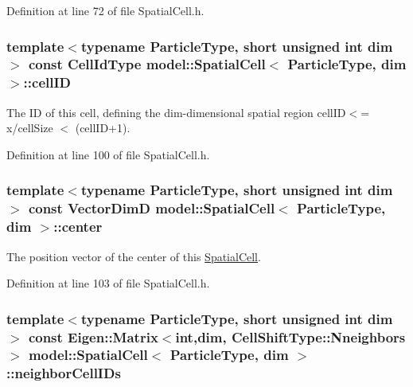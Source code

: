 Definition at line 72 of file Spatial\+Cell.\+h.

\hypertarget{structmodel_1_1_spatial_cell_af197620ccfcaf52638bde5b5d60a1994}{}
\subsubsection[{cell\+I\+D}]{\setlength{\rightskip}{0pt plus 5cm}template$<$typename Particle\+Type, short unsigned int dim$>$ const {\bf Cell\+Id\+Type} {\bf model\+::\+Spatial\+Cell}$<$ Particle\+Type, {\bf dim} $>$\+::cell\+I\+D}\label{structmodel_1_1_spatial_cell_af197620ccfcaf52638bde5b5d60a1994}


The I\+D of this cell, defining the dim-\/dimensional spatial region cell\+I\+D$<$= x/cell\+Size $<$ (cell\+I\+D+1). 



Definition at line 100 of file Spatial\+Cell.\+h.

\hypertarget{structmodel_1_1_spatial_cell_a2a28d9ffe57c615c9ff18f21363276a0}{}
\subsubsection[{center}]{\setlength{\rightskip}{0pt plus 5cm}template$<$typename Particle\+Type, short unsigned int dim$>$ const {\bf Vector\+Dim\+D} {\bf model\+::\+Spatial\+Cell}$<$ Particle\+Type, {\bf dim} $>$\+::center}\label{structmodel_1_1_spatial_cell_a2a28d9ffe57c615c9ff18f21363276a0}


The position vector of the center of this \hyperlink{structmodel_1_1_spatial_cell}{Spatial\+Cell}. 



Definition at line 103 of file Spatial\+Cell.\+h.

\hypertarget{structmodel_1_1_spatial_cell_a80ba891e33f419a9543695ac975db027}{}
\subsubsection[{neighbor\+Cell\+I\+Ds}]{\setlength{\rightskip}{0pt plus 5cm}template$<$typename Particle\+Type, short unsigned int dim$>$ const Eigen\+::\+Matrix$<$int,{\bf dim}, {\bf Cell\+Shift\+Type\+::\+Nneighbors}$>$ {\bf model\+::\+Spatial\+Cell}$<$ Particle\+Type, {\bf dim} $>$\+::neighbor\+Cell\+I\+Ds}\label{structmodel_1_1_spatial_cell_a80ba891e33f419a9543695ac975db027}


